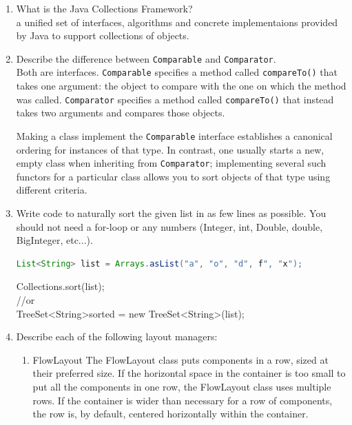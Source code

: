 \documentclass[11pt]{article}
\newenvironment{answer}{\large\lstset{basicstyle=\tiny\ttfamily}\color{white} }{}
\newenvironment{answer}{\large\lstset{basicstyle=\large\ttfamily}\color{red} }{}
\begin{document}
\begin{enumerate}
\item What is the Java Collections Framework? \\
\begin{answer}
    a unified set of interfaces, algorithms and concrete implementaions 
provided by Java to support collections of objects.
\end{answer}





\item Describe the difference between \texttt{Comparable} and \texttt{Comparator}. \\
\begin{answer}
Both are interfaces.
\texttt{Comparable} specifies a method called \texttt{compareTo()} that takes one argument: the object to compare with the one on which the method was called.
\texttt{Comparator} specifies a method called \texttt{compareTo()} that instead takes two arguments and compares those objects.

Making a class implement the \texttt{Comparable} interface establishes a canonical ordering for instances of that type.
In contrast, one usually starts a new, empty class when inheriting from \texttt{Comparator}; implementing several such functors for a particular class allows you to sort objects of that type using different criteria.
\end{answer}



\item Write code to naturally sort the given list in as few lines as possible. You should not need a for-loop or any numbers (Integer, int, Double, double,
BigInteger, etc...).
\begin{lstlisting}[language=java]
List<String> list = Arrays.asList("a", "o", "d", f", "x");
\end{lstlisting}
\begin{answer}
Collections.sort(list);
\\//or
\\TreeSet\textless String\textgreater  sorted = new TreeSet\textless String\textgreater (list);
\end{answer}


\newpage
\item Describe each of the following layout managers:
\begin{enumerate}

\item FlowLayout
\begin{answer}
The FlowLayout class puts components in a row, sized at their preferred size. If the horizontal space in the container is too small to put all the components in one row, the FlowLayout class uses multiple rows. If the container is wider than necessary for a row of components, the row is, by default, centered horizontally within the container. \end{answer}


\end{enumerate}
\end{enumerate}
\end{document}
